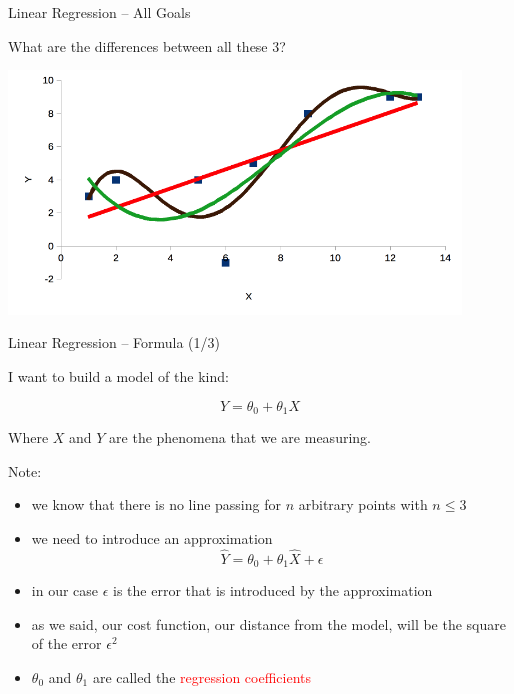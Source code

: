 \documentclass{beamer}
\begin{document}
\begin{frame}
{\centerline{Linear Regression -- All Goals}}

What are the differences between all these 3?

\begin{center}
\includegraphics[width=12cm]{P2023.AIBCCSS.FoundationsDataScience/LinearRegression_O35.png}
\end{center}

\end{frame}




\begin{frame}
{\centerline{Linear Regression -- Formula (1/3)}}
I want to build a model of the kind:

$$ Y = \theta_0 + \theta_1 X $$

Where $X$ and $Y$ are the phenomena that we are measuring.\\
\vspace*{0.3cm}

Note:
\begin{itemize}
\item we know that there is no line passing for $n$ arbitrary points with $n \leq 3$
\item we need to introduce an approximation
$$ \hat{Y} = \theta_0 + \theta_1 \hat{X} + \epsilon $$
\item in our case $\epsilon$ is the error that is introduced by the approximation
\item as we said, our cost function, our distance from the model, will be the square of the error $\epsilon^2$
\item $ \theta_0$ and $\theta_1$ are called the \textcolor{red}{regression coefficients}
\end{itemize}

\end{frame}
\end{document}
